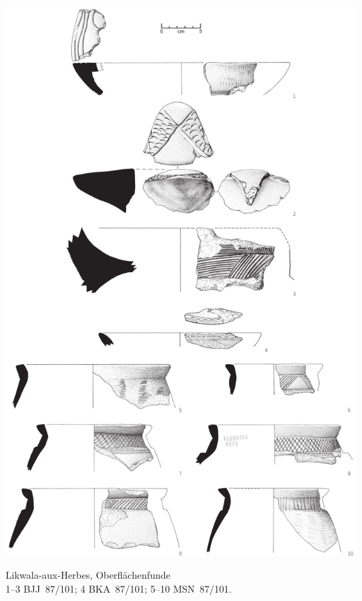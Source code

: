 \begin{pl}[H]
	\includegraphics{plt/Taf79.pdf}
	\vspace{.75em}\caption{Likwala-aux-Herbes, Oberflächenfunde \\ 1--3 BJJ~87/101; 4 BKA~87/101; 5--10 MSN~87/101.}
	\label{pl:79}
\end{pl}

